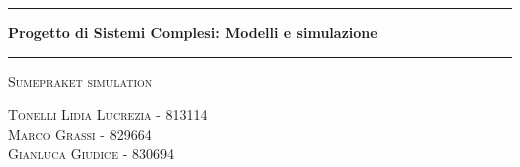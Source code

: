 \begin{titlepage}
	\begin{center}
		
		\vspace*{1.5cm}
		\hrule
		\vspace{0.5cm}
		\huge{\bfseries
			Progetto di Sistemi Complesi: Modelli e simulazione
		}
		\vspace{0.5cm}
		\hrule
		
		\vspace{1.5cm}
		
		\textsc{\huge Sumepraket simulation}\\[1.5cm]
		
		\raggedleft
		\vspace*{\fill}
		\author{Tonelli Lidia Lucrezia (m. 813114) \\ Grassi Marco (m. 830694) \\ Giudice Gianluca (m. 829664)}
		{\Large\textsc{{Tonelli Lidia Lucrezia} - 813114}}\\
		{\Large\textsc{{Marco Grassi} - 829664}}\\
		{\Large\textsc{{Gianluca Giudice} - 830694}}\\
		
		\vspace*{3cm}
		
	\end{center}
\end{titlepage}